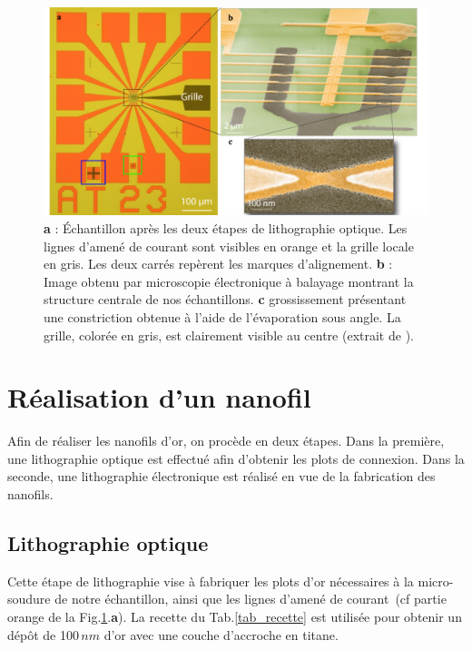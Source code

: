 \begin{figure}
\centering \includegraphics[scale=0.45]{Fabrication/FinalResult/FinalResult.pdf}
\caption{\textbf{a} : Échantillon après les deux étapes de lithographie optique. Les lignes d'amené de courant sont visibles en orange et la grille locale en gris. Les deux carrés repèrent les marques d'alignement. \textbf{b} : Image obtenu par microscopie électronique à balayage montrant la structure centrale de nos échantillons. \textbf{c} grossissement présentant une constriction obtenue à l'aide de l'évaporation sous angle. La grille, colorée en gris, est clairement visible au centre (extrait de \cite{RochPhD}).}
\label{FinalResult}
\end{figure}


\section{Réalisation d'un nanofil}

Afin de réaliser les nanofils d'or, on procède en deux étapes. Dans la première, une lithographie optique est effectué afin d'obtenir les plots de connexion. Dans la seconde, une lithographie électronique est réalisé en vue de la fabrication des nanofils.

\subsection{Lithographie optique}

Cette étape de lithographie vise à fabriquer les plots d'or nécessaires à la micro-soudure de notre échantillon, ainsi que les lignes d'amené de courant~(cf partie orange de la Fig.\ref{FinalResult}.\textbf{a}). La recette du Tab.\ref{tab_recette}  est utilisée pour obtenir un dép\^ot de 100$\,nm$ d'or avec une couche d'accroche en titane.


